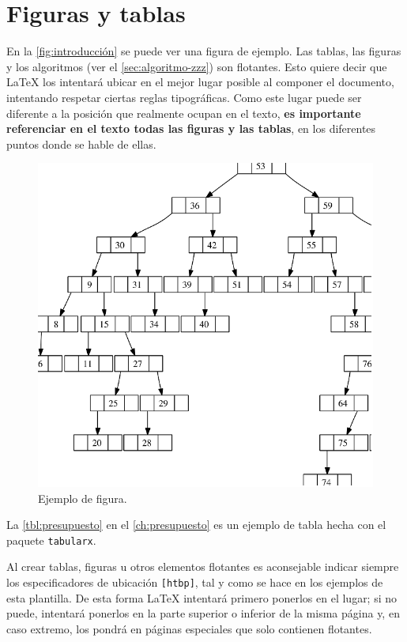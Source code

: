 \section{Figuras y tablas}

En la \autoref{fig:introducción} se puede ver una figura de ejemplo. Las tablas, las figuras y los algoritmos (ver el \autoref{sec:algoritmo-zzz}) son flotantes. Esto quiere decir que \LaTeX{} los intentará ubicar en el mejor lugar posible al componer el documento, intentando respetar ciertas reglas tipográficas. Como este lugar puede ser diferente a la posición que realmente ocupan en el texto, \textbf{es importante referenciar en el texto todas las figuras y las tablas}, en los diferentes puntos donde se hable de ellas.

\begin{figure}[htbp]
   \centering
   \includegraphics[width=0.8\linewidth]{images/figura_1}
   \caption{Ejemplo de figura.}
   \label{fig:introducción}
\end{figure}

La \autoref{tbl:presupuesto} en el \autoref{ch:presupuesto} es un ejemplo de tabla hecha con el paquete \verb|tabularx|.

Al crear tablas, figuras u otros elementos flotantes es aconsejable indicar siempre los especificadores de ubicación \verb|[htbp]|, tal y como se hace en los ejemplos de esta plantilla. De esta forma \LaTeX{} intentará primero ponerlos en el lugar; si no puede, intentará ponerlos en la parte superior o inferior de la misma página y, en caso extremo, los pondrá en páginas especiales que solo contienen flotantes.

